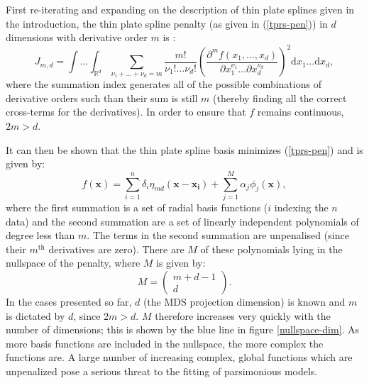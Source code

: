 First re-iterating and expanding on the description of thin plate splines given in the introduction, the thin plate spline penalty (as given in (\ref{tprs-pen})) in $d$ dimensions with derivative order $m$ is :
\begin{equation*}
J_{m,d} = \int \ldots \int_{\mathbb{R}^d} \sum_{\nu_1 + \dots + \nu_d=m} \frac{m!}{\nu_1! \dots \nu_d!} \left( \frac{\partial^m f \left (x_1,\dots,x_d \right )}{\partial x_1^{\nu_1} \ldots  \partial x_d^{\nu_d}} \right)^2 \text{d} x_1 \ldots  \text{d} x_d,
\end{equation*}
where the summation index generates all of the possible combinations of derivative orders such than their sum is still $m$ (thereby finding all the correct cross-terms for the derivatives). In order to ensure that $f$ remains continuous, $2m>d$.

It can then be shown that the thin plate spline basis minimizes (\ref{tprs-pen}) and is given by:
\begin{equation*}
f(\mathbf{x}) = \sum_{i=1}^n \delta_i \eta_{md}(\mathbf{x}-\mathbf{x_i}) + \sum_{j=1}^M \alpha_j \phi_j(\mathbf{x}),
\end{equation*}
where the first summation is a set of radial basis functions ($i$ indexing the $n$ data) and the second summation are a set of linearly independent polynomials of degree less than $m$. The terms in the second summation are unpenalised (since their $m^\text{th}$ derivatives are zero).  There are $M$ of these polynomials lying in the nullspace of the penalty, where $M$ is given by:
\begin{equation}
M=\begin{pmatrix} m+d-1 \\ d  \end{pmatrix}.
\label{gds-bigm}
\end{equation}
In the cases presented so far, $d$ (the MDS projection dimension) is known and $m$ is dictated by $d$, since $2m>d$. $M$ therefore increases very quickly with the number of dimensions; this is shown by the blue line in figure \ref{nullspace-dim}. As more basis functions are included in the nullspace, the more complex the functions are. A large number of increasing complex, global functions which are unpenalized pose a serious threat to the fitting of parsimonious models.

